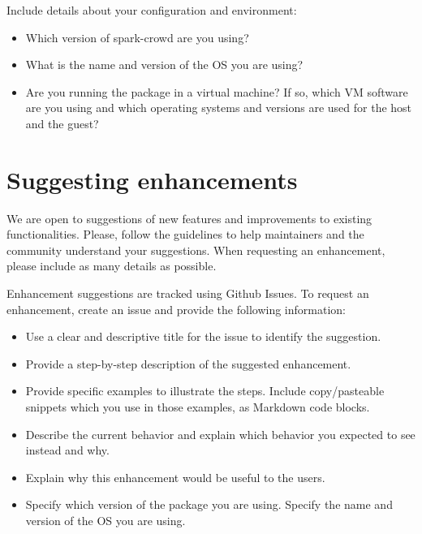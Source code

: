 \documentclass[letterpaper,10pt,english]{sphinxmanual}
\begin{document}
Include details about your configuration and environment:
\begin{itemize}
\item {} 
Which version of spark-crowd are you using?

\item {} 
What is the name and version of the OS you are using?

\item {} 
Are you running the package in a virtual machine? If so, which VM software are you using and which operating systems and versions are used for the host and the guest?

\end{itemize}


\section{Suggesting enhancements}
\label{\detokenize{package/contributors:suggesting-enhancements}}
We are open to suggestions of new features and improvements to existing functionalities. Please, follow the guidelines to help maintainers and the community
understand your suggestions. When requesting an enhancement, please include as many details as possible.

Enhancement suggestions are tracked using Github Issues. To request an enhancement, create an issue and provide the following information:
\begin{itemize}
\item {} 
Use a clear and descriptive title for the issue to identify the suggestion.

\item {} 
Provide a step-by-step description of the suggested enhancement.

\item {} 
Provide specific examples to illustrate the steps. Include copy/pasteable snippets which you use in those examples, as Markdown code blocks.

\item {} 
Describe the current behavior and explain which behavior you expected to see instead and why.

\item {} 
Explain why this enhancement would be useful to the users.

\item {} 
Specify which version of the package you are using. Specify the name and version of the OS you are using.

\end{itemize}
\end{document}
